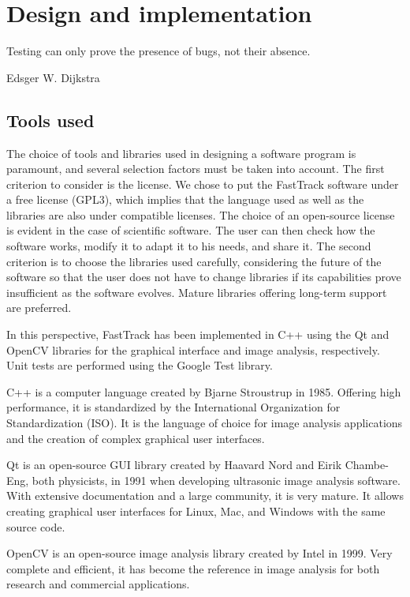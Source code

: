 \chapter{Design and implementation}

    \epigraph{Testing can only prove the presence of bugs, not their absence.}{Edsger W. Dijkstra}

    \section{Tools used}

    The choice of tools and libraries used in designing a software program is paramount, and several selection factors must be taken into account.
    The first criterion to consider is the license. We chose to put the FastTrack software under a free license (GPL3), which implies that the language used as well as the libraries are also under compatible licenses. The choice of an open-source license is evident in the case of scientific software. The user can then check how the software works, modify it to adapt it to his needs, and share it.
    The second criterion is to choose the libraries used carefully, considering the future of the software so that the user does not have to change libraries if its capabilities prove insufficient as the software evolves. Mature libraries offering long-term support are preferred.

    In this perspective, FastTrack has been implemented in C++ using the Qt \cite{Qt} and OpenCV \cite{opencv_library} libraries for the graphical interface and image analysis, respectively. Unit tests are performed using the Google Test library.

    C++ is a computer language created by Bjarne Stroustrup in 1985. Offering high performance, it is standardized by the International Organization for Standardization (ISO). It is the language of choice for image analysis applications and the creation of complex graphical user interfaces.

    Qt is an open-source GUI library created by Haavard Nord and Eirik Chambe-Eng, both physicists, in 1991 when developing ultrasonic image analysis software. With extensive documentation and a large community, it is very mature. It allows creating graphical user interfaces for Linux, Mac, and Windows with the same source code.

    OpenCV is an open-source image analysis library created by Intel in 1999. Very complete and efficient, it has become the reference in image analysis for both research and commercial applications.

